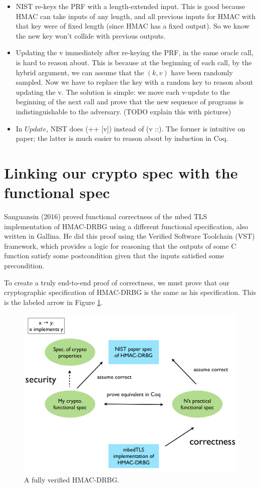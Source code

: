 \documentclass[12pt,lot, lof]{puthesis}
\newcommand{\kv} {$(k, v)$ }
\begin{document}
{\begin{itemize}
\item NIST re-keys the PRF with a length-extended input. This is good because HMAC can take inputs of any length, and all previous inputs for HMAC with that key were of fixed length (since HMAC has a fixed output). So we know the new key won't collide with previous outputs.
\item Updating the v immediately after re-keying the PRF, in the same oracle call, is hard to reason about. This is because at the beginning of each call, by the hybrid argument, we can assume that the \kv have been randomly sampled. Now we have to replace the key with a random key to reason about updating the v. The solution is simple: we move each v-update to the beginning of the next call and prove that the new sequence of programs is indistinguishable to the adversary. (TODO explain this with pictures)
\item In $Update$, NIST does (++ [v]) instead of (v ::). The former is intuitive on paper; the latter is much easier to reason about by induction in Coq.
\end{itemize}

\section{Linking our crypto spec with the functional spec}

Sanguansin (2016) proved functional correctness of the mbed TLS implementation of HMAC-DRBG using a different functional specification, also written in Gallina. He did this proof using the Verified Software Toolchain (VST) framework, which provides a logic for reasoning that the outputs of some C function satisfy some postcondition given that the inputs satisfied some precondition.

To create a truly end-to-end proof of correctness, we must prove that our cryptographic specification of HMAC-DRBG is the same as his specification. This is the labeled arrow in Figure \ref{fig:project_diagram}.

\begin{figure}
  \includegraphics[width=\linewidth]{images/project_diagram.png}
  \caption{A fully verified HMAC-DRBG.}
  \label{fig:project_diagram}
\end{figure}

}
\end{document}
